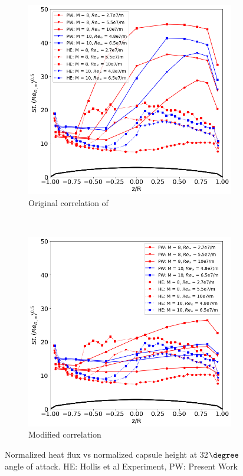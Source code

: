 \documentclass[%
 aip,
 amsmath,amssymb,
preprint,%
]{revtex4-1}
\begin{document}
\begin{figure}[h]
\centering
\begin{subfigure}[b]{0.49\textwidth}
\centering
\includegraphics[width=\textwidth]{St-32-hollis.png}
\caption{Original correlation of \cite{hollis_aeroheating_2009}}
\label{St-32-hollis}
\end{subfigure}
~
\begin{subfigure}[b]{0.49\textwidth}
\centering
\includegraphics[width=\textwidth]{St-32-hollis-new.png}
\caption{Modified correlation}
\label{St-32-hollis-new}
\end{subfigure}
\caption{Normalized heat flux vs normalized capsule height at 32$\degree$ angle of attack. HE: Hollis et al Experiment, PW: Present Work}
\end{figure}




\clearpage

\end{document}
